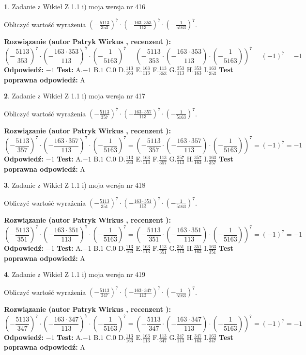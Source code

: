 \documentclass[12pt, a4paper]{article}
\theoremstyle{definition} %
\newtheorem{zad}{}
\newcommand{\zadStart}[1]{\begin{zad}#1\newline}
\newcommand{\zadStop}{\end{zad}}
\newcommand{\rozwStart}[2]{\noindent \textbf{Rozwiązanie (autor #1 , recenzent #2): }\newline}
\newcommand{\rozwStop}{\newline}
\newcommand{\odpStart}{\noindent \textbf{Odpowiedź:}\newline}
\newcommand{\odpStop}{\newline}
\newcommand{\testStart}{\noindent \textbf{Test:}\newline}
\newcommand{\testStop}{\newline}
\newcommand{\kluczStart}{\noindent \textbf{Test poprawna odpowiedź:}\newline}
\newcommand{\kluczStop}{\newline}
\begin{document}
\zadStart{Zadanie z Wikieł Z 1.1 i) moja wersja nr 416}

Obliczyć wartość wyrażenia $(-\frac{5113}{353})^{7} \cdot (-\frac{163 \cdot 353}{113})^{7} \cdot (-\frac{1}{5163})^{7}$.
\zadStop
\rozwStart{Patryk Wirkus}{}
$$(-\frac{5113}{353})^{7} \cdot (-\frac{163 \cdot 353}{113})^{7} \cdot (-\frac{1}{5163})^{7} = (-\frac{5113}{353} \cdot (-\frac{163 \cdot 353}{113}) \cdot (-\frac{1}{5163}))^{7} = (-1)^{7} = -1$$
\rozwStop
\odpStart
$-1$
\odpStop
\testStart
A.$-1$ B.$1$ C.$0$ D.$\frac{113}{163}$ E.$\frac{163}{113}$
F.$\frac{113}{353}$ G.$\frac{353}{113}$
H.$\frac{353}{163}$
I.$\frac{163}{353}$
\testStop
\kluczStart
A
\kluczStop



\zadStart{Zadanie z Wikieł Z 1.1 i) moja wersja nr 417}

Obliczyć wartość wyrażenia $(-\frac{5113}{357})^{7} \cdot (-\frac{163 \cdot 357}{113})^{7} \cdot (-\frac{1}{5163})^{7}$.
\zadStop
\rozwStart{Patryk Wirkus}{}
$$(-\frac{5113}{357})^{7} \cdot (-\frac{163 \cdot 357}{113})^{7} \cdot (-\frac{1}{5163})^{7} = (-\frac{5113}{357} \cdot (-\frac{163 \cdot 357}{113}) \cdot (-\frac{1}{5163}))^{7} = (-1)^{7} = -1$$
\rozwStop
\odpStart
$-1$
\odpStop
\testStart
A.$-1$ B.$1$ C.$0$ D.$\frac{113}{163}$ E.$\frac{163}{113}$
F.$\frac{113}{357}$ G.$\frac{357}{113}$
H.$\frac{357}{163}$
I.$\frac{163}{357}$
\testStop
\kluczStart
A
\kluczStop



\zadStart{Zadanie z Wikieł Z 1.1 i) moja wersja nr 418}

Obliczyć wartość wyrażenia $(-\frac{5113}{351})^{7} \cdot (-\frac{163 \cdot 351}{113})^{7} \cdot (-\frac{1}{5163})^{7}$.
\zadStop
\rozwStart{Patryk Wirkus}{}
$$(-\frac{5113}{351})^{7} \cdot (-\frac{163 \cdot 351}{113})^{7} \cdot (-\frac{1}{5163})^{7} = (-\frac{5113}{351} \cdot (-\frac{163 \cdot 351}{113}) \cdot (-\frac{1}{5163}))^{7} = (-1)^{7} = -1$$
\rozwStop
\odpStart
$-1$
\odpStop
\testStart
A.$-1$ B.$1$ C.$0$ D.$\frac{113}{163}$ E.$\frac{163}{113}$
F.$\frac{113}{351}$ G.$\frac{351}{113}$
H.$\frac{351}{163}$
I.$\frac{163}{351}$
\testStop
\kluczStart
A
\kluczStop



\zadStart{Zadanie z Wikieł Z 1.1 i) moja wersja nr 419}

Obliczyć wartość wyrażenia $(-\frac{5113}{347})^{7} \cdot (-\frac{163 \cdot 347}{113})^{7} \cdot (-\frac{1}{5163})^{7}$.
\zadStop
\rozwStart{Patryk Wirkus}{}
$$(-\frac{5113}{347})^{7} \cdot (-\frac{163 \cdot 347}{113})^{7} \cdot (-\frac{1}{5163})^{7} = (-\frac{5113}{347} \cdot (-\frac{163 \cdot 347}{113}) \cdot (-\frac{1}{5163}))^{7} = (-1)^{7} = -1$$
\rozwStop
\odpStart
$-1$
\odpStop
\testStart
A.$-1$ B.$1$ C.$0$ D.$\frac{113}{163}$ E.$\frac{163}{113}$
F.$\frac{113}{347}$ G.$\frac{347}{113}$
H.$\frac{347}{163}$
I.$\frac{163}{347}$
\testStop
\kluczStart
A
\kluczStop
\end{document}
